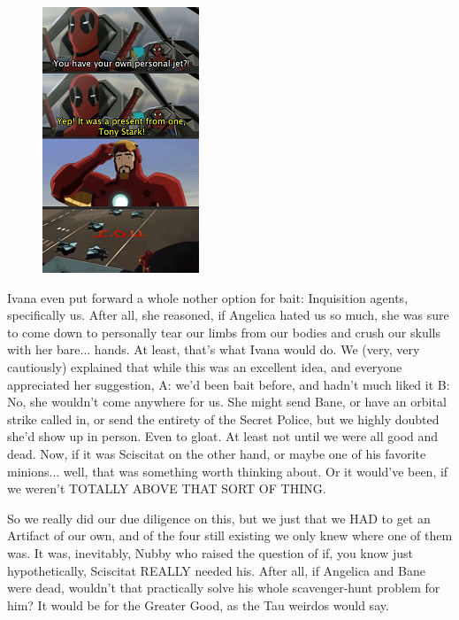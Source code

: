 \begin{figure}
	\begin{center}
		\includegraphics[width=\figwidth]{pics/19/31.png}
	\end{center}
\end{figure}
Ivana even put forward a whole nother option for bait: 
Inquisition agents, specifically us. 
After all, she reasoned, if Angelica hated us so much, she was sure to come down to personally tear our limbs from our bodies and crush our skulls with her bare... 
hands. 
At least, that's what Ivana would do. 
We (very, very cautiously) explained that while this was an excellent idea, and everyone appreciated her suggestion, A: 
we'd been bait before, and hadn't much liked it B: 
No, she wouldn't come anywhere for us. 
She might send Bane, or have an orbital strike called in, or send the entirety of the Secret Police, but we highly doubted she'd show up in person. 
Even to gloat. 
At least not until we were all good and dead. 
Now, if it was Sciscitat on the other hand, or maybe one of his favorite minions... 
well, that was something worth thinking about. 
Or it would've been, if we weren't TOTALLY ABOVE THAT SORT OF THING.

So we really did our due diligence on this, but we just that we HAD to get an Artifact of our own, and of the four still existing we only knew where one of them was. 
It was, inevitably, Nubby who raised the question of if, you know just hypothetically, Sciscitat REALLY needed his. 
After all, if Angelica and Bane were dead, wouldn't that practically solve his whole scavenger-hunt problem for him? 
It would be for the Greater Good, as the Tau weirdos would say.


